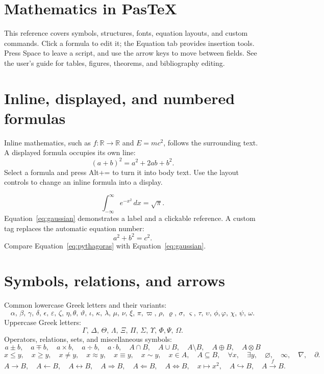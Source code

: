 \documentclass[12pt]{article}
\newcommand{\R}{\mathbb{R}}
\begin{document}
\section*{Mathematics in PasTeX}
This reference covers symbols, structures, fonts, equation layouts, and custom
commands. Click a formula to edit it; the Equation tab provides insertion tools.
Press Space to leave a script, and use the arrow keys to move between fields.
See the user's guide for tables, figures, theorems, and bibliography editing.

\section{Inline, displayed, and numbered formulas}
Inline mathematics, such as $f\colon\R\to\R$ and $E=mc^2$, follows the surrounding
text. A displayed formula occupies its own line:
\[
 (a+b)^2=a^2+2ab+b^2.
\]
Select a formula and press Alt+= to turn it into body text. Use the layout
controls to change an inline formula into a display.

\begin{equation}\label{eq:gaussian}
 \int_{-\infty}^{\infty}e^{-x^2}\,dx=\sqrt{\pi}.
\end{equation}
Equation~\eqref{eq:gaussian} demonstrates a label and a clickable reference.
A custom tag replaces the automatic equation number:
\begin{equation}
 a^2+b^2=c^2.\tag{P}\label{eq:pythagoras}
\end{equation}
Compare Equation~\eqref{eq:pythagoras} with Equation~\eqref{eq:gaussian}.

\section{Symbols, relations, and arrows}
Common lowercase Greek letters and their variants:
\[
 \alpha,\,\beta,\,\gamma,\,\delta,\,\epsilon,\,\varepsilon,\,\zeta,\,\eta,
 \theta,\,\vartheta,\,\iota,\,\kappa,\,\lambda,\,\mu,\,\nu,\,\xi,\,\pi,
 \varpi,\,\rho,\,\varrho,\,\sigma,\,\varsigma,\,\tau,\,\upsilon,\,\phi,
 \varphi,\,\chi,\,\psi,\,\omega.
\]
Uppercase Greek letters:
\[
 \Gamma,\,\Delta,\,\Theta,\,\Lambda,\,\Xi,\,\Pi,\,\Sigma,\,\Upsilon,\,\Phi,
 \Psi,\,\Omega.
\]
Operators, relations, sets, and miscellaneous symbols:
\[
 a\pm b,\quad a\mp b,\quad a\times b,\quad a\div b,\quad a\cdot b,\quad
 A\cap B,\quad A\cup B,\quad A\setminus B,\quad A\oplus B,\quad A\otimes B
\]
\[
 x\leq y,\quad x\geq y,\quad x\neq y,\quad x\approx y,\quad x\equiv y,\quad
 x\sim y,\quad x\in A,\quad A\subseteq B,\quad \forall x,\quad \exists y,\quad
 \varnothing,\quad \infty,\quad \nabla,\quad \partial.
\]
\[
 A\to B,\quad A\leftarrow B,\quad A\leftrightarrow B,\quad
 A\Rightarrow B,\quad A\Leftarrow B,\quad A\Leftrightarrow B,\quad
 x\mapsto x^2,\quad A\hookrightarrow B,\quad A\xrightarrow{f}B.
\]
\end{document}
